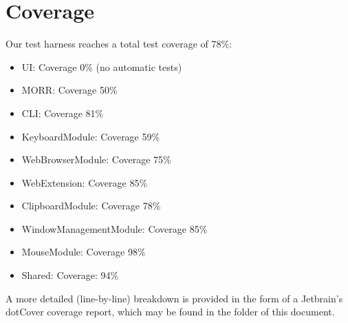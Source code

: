 \chapter{Coverage}

Our test harness reaches a total test coverage of 78\%:
\begin{itemize}
    \item UI: Coverage 0\% (no automatic tests)
    \item MORR: Coverage 50\%
    \item CLI: Coverage 81\%
    \item KeyboardModule: Coverage 59\%
    \item WebBrowserModule: Coverage 75\%
    \item WebExtension: Coverage 85\%
    \item ClipboardModule: Coverage 78\%
    \item WindowManagementModule: Coverage 85\%
    \item MouseModule: Coverage 98\%
    \item Shared: Coverage: 94\%
\end{itemize}

A more detailed (line-by-line) breakdown is provided in the form of a Jetbrain's dotCover coverage report, which may be found in the folder of this document.
